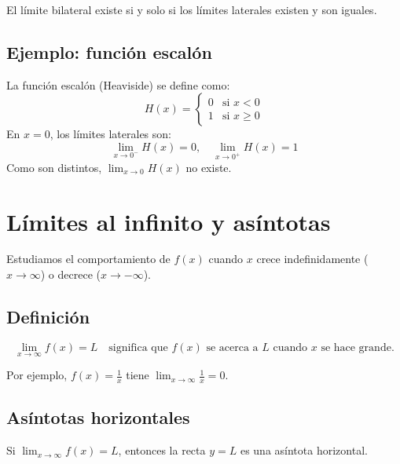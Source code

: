 \documentclass[12pt,a4paper,openany,oneside]{book}
\begin{document}
El límite bilateral existe si y solo si los límites laterales existen y son iguales.

\subsection{Ejemplo: función escalón}
La función escalón (Heaviside) se define como:
\[
H(x) = \begin{cases}
0 & \text{si } x < 0 \\
1 & \text{si } x \ge 0
\end{cases}
\]
En $x=0$, los límites laterales son:
\[
\lim_{x \to 0^-} H(x) = 0, \quad \lim_{x \to 0^+} H(x) = 1
\]
Como son distintos, $\lim_{x \to 0} H(x)$ no existe.

\begin{center}
\end{center}

\section{Límites al infinito y asíntotas}

Estudiamos el comportamiento de $f(x)$ cuando $x$ crece indefinidamente ($x \to \infty$) o decrece ($x \to -\infty$).

\subsection{Definición}
\[
\lim_{x \to \infty} f(x) = L \quad \text{significa que $f(x)$ se acerca a $L$ cuando $x$ se hace grande.}
\]

Por ejemplo, $f(x) = \frac{1}{x}$ tiene $\lim_{x \to \infty} \frac{1}{x} = 0$.

\subsection{Asíntotas horizontales}
Si $\lim_{x \to \infty} f(x) = L$, entonces la recta $y = L$ es una asíntota horizontal.
\end{document}
